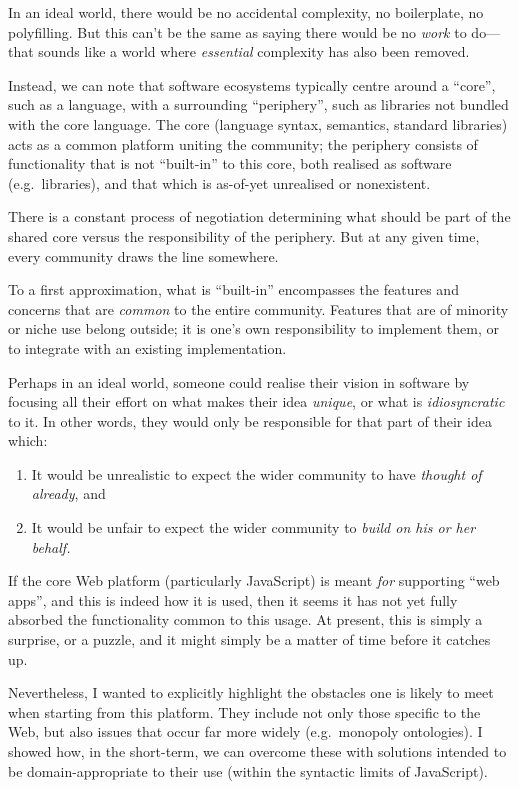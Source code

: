 In an ideal world, there would be no accidental complexity, no
boilerplate, no polyfilling. But this can't be the same as saying there
would be no \emph{work} to do---that sounds like a world where
\emph{essential} complexity has also been removed.

Instead, we can note that software ecosystems typically centre around a
``core'', such as a language, with a surrounding ``periphery'', such as
libraries not bundled with the core language. The core (language syntax,
semantics, standard libraries) acts as a common platform uniting the
community; the periphery consists of functionality that is not
``built-in'' to this core, both realised as software (e.g.~libraries),
and that which is as-of-yet unrealised or nonexistent.

There is a constant process of negotiation determining what should be
part of the shared core versus the responsibility of the periphery. But
at any given time, every community draws the line somewhere.

To a first approximation, what is ``built-in'' encompasses the features
and concerns that are \emph{common} to the entire community. Features
that are of minority or niche use belong outside; it is one's own
responsibility to implement them, or to integrate with an existing
implementation.

Perhaps in an ideal world, someone could realise their vision in
software by focusing all their effort on what makes their idea
\emph{unique}, or what is \emph{idiosyncratic} to it. In other words,
they would only be responsible for that part of their idea which:

\begin{enumerate}
\def\labelenumi{\arabic{enumi}.}
\tightlist
\item
  It would be unrealistic to expect the wider community to have
  \emph{thought of already}, and
\item
  It would be unfair to expect the wider community to \emph{build on his
  or her behalf.}
\end{enumerate}

If the core Web platform (particularly JavaScript) is meant \emph{for}
supporting ``web apps'', and this is indeed how it is used, then it
seems it has not yet fully absorbed the functionality common to this
usage. At present, this is simply a surprise, or a puzzle, and it might
simply be a matter of time before it catches up.

Nevertheless, I wanted to explicitly highlight the obstacles one is
likely to meet when starting from this platform. They include not only
those specific to the Web, but also issues that occur far more widely
(e.g.~monopoly ontologies). I showed how, in the short-term, we can
overcome these with solutions intended to be domain-appropriate to their
use (within the syntactic limits of JavaScript).

